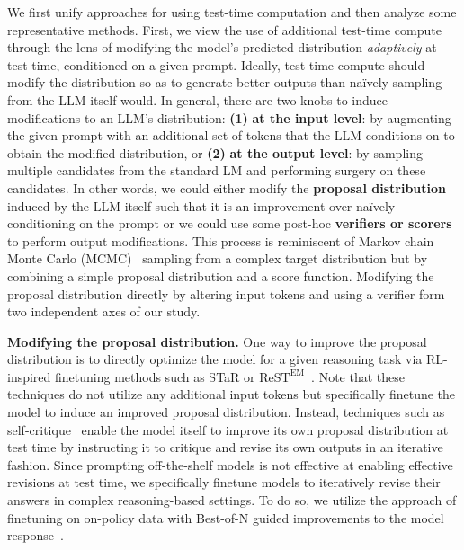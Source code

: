 \documentclass[11pt, letterpaper, logo]{googledeepmind}
\begin{document}
We first unify approaches for using test-time computation and then analyze some representative methods. First, we view the use of additional test-time compute through the lens of modifying the model's predicted distribution \emph{adaptively} at test-time, conditioned on a given prompt. Ideally, test-time compute should modify the distribution so as to generate better outputs than na\"ively sampling from the LLM itself would. In general, there are two knobs to induce modifications to an LLM's distribution: \textbf{(1)} \textbf{at the input level}: by augmenting the given prompt with an additional set of tokens that the LLM conditions on to obtain the modified distribution, or \textbf{(2)} \textbf{at the output level}: by sampling multiple candidates from the standard LM and performing surgery on these candidates. In other words, we could either modify the \textbf{proposal distribution} induced by the LLM itself such that it is an improvement over na\"ively conditioning on the prompt or we could use some post-hoc \textbf{verifiers or scorers} to perform output modifications. This process is reminiscent of Markov chain Monte Carlo (MCMC)~\citep{andrieu2003introduction} sampling from a complex target distribution but by combining a simple proposal distribution and a score function.
Modifying the proposal distribution directly by altering input tokens and using a verifier form two independent axes of our study.

\textbf{Modifying the proposal distribution.} One way to improve the proposal distribution is to directly optimize the model for a given reasoning task via RL-inspired finetuning methods such as STaR or $\text{ReST}^{\text{EM}}$~\citep{zelikman2022star,singh2024human}. Note that these techniques do not utilize any additional input tokens but specifically finetune the model to induce an improved proposal distribution.
Instead, techniques such as self-critique~\citep{bai2022constitutional,madaan2023selfrefine,du2023improving,saunders2022selfcritiquing} enable the model itself to improve its own proposal distribution at test time by instructing it to critique and revise its own outputs in an iterative fashion. Since prompting off-the-shelf models is not effective at enabling effective revisions at test time, we specifically finetune models to iteratively revise their answers in complex reasoning-based settings. To do so, we utilize the approach of finetuning on on-policy data with Best-of-N guided improvements to the model response~\citep{qu2024recursive}. 
\end{document}
